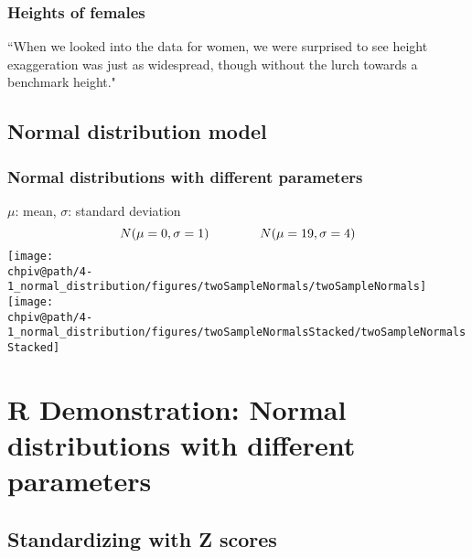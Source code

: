 \documentclass[slidestop,compress,mathserif]{beamer}
\makeatletter
\def\chpiv@path{../../Chp 4}
\makeatother
\begin{document}

\begin{frame}
\frametitle{Heights of females}

{
\pause
{\footnotesize ``When we looked into the data for women, we were surprised to see height exaggeration was just as widespread, though without the lurch towards a benchmark height."
}
}

\vfill


\end{frame}


\subsection{Normal distribution model}


\begin{frame}
\frametitle{Normal distributions with different parameters}

\vspace{-0.5cm}
\begin{center}
$\mu$: mean, $\sigma$: standard deviation
\[N(\mu = 0, \sigma = 1) \hspace{1.4cm} N(\mu = 19, \sigma = 4) \]
\texttt{[image: \\chpiv@path/4-1\_normal\_distribution/figures/twoSampleNormals/twoSampleNormals]} \\
\texttt{[image: \\chpiv@path/4-1\_normal\_distribution/figures/twoSampleNormalsStacked/twoSampleNormalsStacked]}
\end{center}

\end{frame}


\section{R Demonstration: Normal distributions with different parameters}


\subsection{Standardizing with Z scores}
\end{document}
